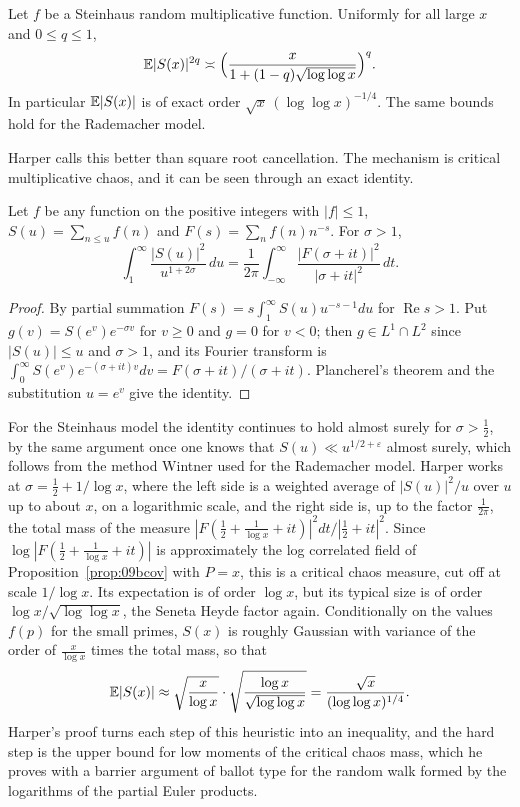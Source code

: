 \begin{theorem}\label{thm:09bharper}
Let $f$ be a Steinhaus random multiplicative function. Uniformly for all large $x$ and $0\le q\le1$,
\[
\mathbb{E}|S(x)|^{2q}\asymp\Bigl(\frac{x}{1+(1-q)\sqrt{\log\log x}}\Bigr)^q .
\]
In particular $\mathbb{E}|S(x)|$ is of exact order $\sqrt x\,(\log\log x)^{-1/4}$. The same bounds hold for the Rademacher model.
\end{theorem}

Harper calls this better than square root cancellation. The mechanism is critical multiplicative chaos, and it can be seen through an exact identity.

\begin{lemma}\label{lem:09bplancherel}
Let $f$ be any function on the positive integers with $|f|\le1$, $S(u)=\sum_{n\le u}f(n)$ and $F(s)=\sum_nf(n)n^{-s}$. For $\sigma>1$,
\[
\int_1^\infty\frac{|S(u)|^2}{u^{1+2\sigma}}\,du=\frac{1}{2\pi}\int_{-\infty}^\infty\frac{|F(\sigma+it)|^2}{|\sigma+it|^2}\,dt .
\]
\end{lemma}

\begin{proof}
By partial summation $F(s)=s\int_1^\infty S(u)u^{-s-1}du$ for $\operatorname{Re}s>1$. Put $g(v)=S(e^v)e^{-\sigma v}$ for $v\ge0$ and $g=0$ for $v<0$; then $g\in L^1\cap L^2$ since $|S(u)|\le u$ and $\sigma>1$, and its Fourier transform is $\int_0^\infty S(e^v)e^{-(\sigma+it)v}dv=F(\sigma+it)/(\sigma+it)$. Plancherel's theorem and the substitution $u=e^v$ give the identity.
\end{proof}

For the Steinhaus model the identity continues to hold almost surely for $\sigma>\frac12$, by the same argument once one knows that $S(u)\ll u^{1/2+\varepsilon}$ almost surely, which follows from the method Wintner used for the Rademacher model. Harper works at $\sigma=\frac12+1/\log x$, where the left side is a weighted average of $|S(u)|^2/u$ over $u$ up to about $x$, on a logarithmic scale, and the right side is, up to the factor $\frac1{2\pi}$, the total mass of the measure $|F(\frac12+\frac1{\log x}+it)|^2dt/|\frac12+it|^2$. Since $\log|F(\frac12+\frac1{\log x}+it)|$ is approximately the log correlated field of Proposition~\ref{prop:09bcov} with $P=x$, this is a critical chaos measure, cut off at scale $1/\log x$. Its expectation is of order $\log x$, but its typical size is of order $\log x/\sqrt{\log\log x}$, the Seneta Heyde factor again. Conditionally on the values $f(p)$ for the small primes, $S(x)$ is roughly Gaussian with variance of the order of $\frac{x}{\log x}$ times the total mass, so that
\[
\mathbb{E}|S(x)|\approx\sqrt{\frac{x}{\log x}}\cdot\sqrt{\frac{\log x}{\sqrt{\log\log x}}}=\frac{\sqrt x}{(\log\log x)^{1/4}} .
\]
Harper's proof turns each step of this heuristic into an inequality, and the hard step is the upper bound for low moments of the critical chaos mass, which he proves with a barrier argument of ballot type for the random walk formed by the logarithms of the partial Euler products.


